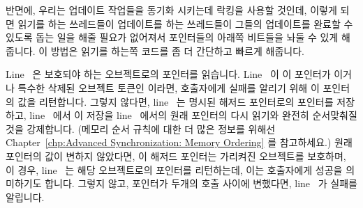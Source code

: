 \begin{lineref}
{	반면에, 우리는 업데이트 작업들을 동기화 시키는데 락킹을 사용할 것인데,
	이렇게 되면 읽기를 하는 쓰레드들이 업데이트를 하는 쓰레드들이 그들의
	업데이트를 완료할 수 있도록 돕는 일을 해줄 필요가 없어져서 포인터들의
	아래쪽 비트들을 놔둘 수 있게 해줍니다.
	이 방법은 읽기를 하는쪽 코드를 좀 더 간단하고 빠르게 해줍니다.

} \QuickQuizEnd

Line~ 은 보호되야 하는 오브젝트로의 포인터를 읽습니다.
Line~ 이 이 포인터가  이거나 특수한 삭제된 오브젝트
토큰인  이라면, 호출자에게 실패를 알리기 위해 이 포인터의
값을 리턴합니다.
그렇지 않다면, line~ 는 명시된 해저드 포인터로의 포인터를
저장하고, line~ 에서 이 저장을 line~ 에서의 원래
포인터의 다시 읽기와 완전히 순서맞춰질 것을 강제합니다.
(메모리 순서 규칙에 대한 더 많은 정보를 위해선
Chapter~\ref{chp:Advanced Synchronization: Memory Ordering} 를 참고하세요.)
원래 포인터의 값이 변하지 않았다면, 이 해저드 포인터는 가리켜진 오브젝트를
보호하며, 이 경우, line~ 는 해당 오브젝트로의 포인터를
리턴하는데, 이는 호출자에게 성공을 의미하기도 합니다.
그렇지 않고, 포인터가 두개의  호출 사이에 변했다면,
line~ 가 실패를 알립니다.

\end{lineref}
